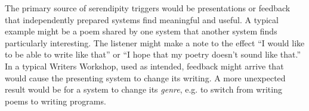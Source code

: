 The primary source of serendipity triggers would be presentations or
feedback that independently prepared systems find meaningful and
useful.  A typical example might be a poem shared by one system that
another system finds particularly interesting.  The listener might
make a note to the effect ``I would like to be able to write like
that'' or ``I hope that my poetry doesn't sound like that.''  In a
typical Writers Workshop, used as intended, feedback might arrive that
would cause the presenting system to change its writing.  A more
unexpected result would be for a system to change its \emph{genre},
e.g. to switch from writing poems to writing programs.

